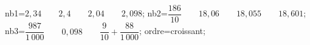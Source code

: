 \documentclass[exercice]{thedocument}%
\begin{document}
%
    \>nb1={$2,34\qquad 2,4\qquad 2,04\qquad 2,098$};%
    \>nb2={$\dfrac{186}{10}\qquad 18,06\qquad 18,055\qquad 18,601$};%
    \>nb3={$\dfrac{987}{1\,000}\qquad0,098\qquad\dfrac{9}{10}+\dfrac{88}{1\,000}$};%
    \>ordre=croissant;%
\end{document}

